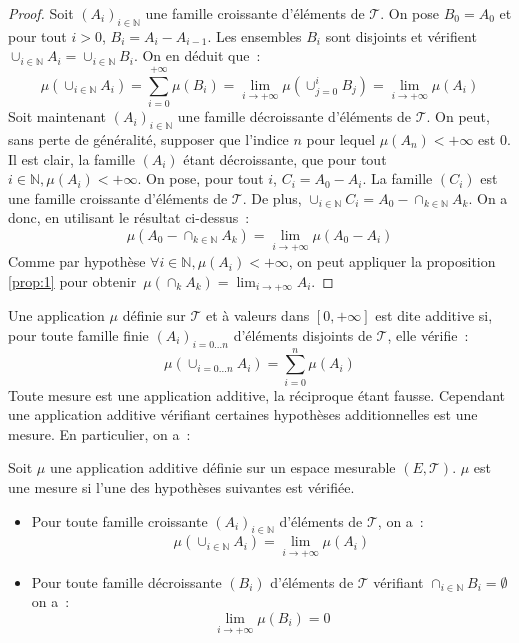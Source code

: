 \begin{proof}
Soit $(A_i)_{i \in \mathbb{N}}$ une famille croissante d'éléments de
$\mathcal{T}$. On pose $B_0 = A_0$ et pour tout $i> 0$, $B_i = A_i -
A_{i-1}$. Les ensembles $B_i$ sont disjoints et vérifient $\cup_{i \in
  \mathbb{N}} A_i
= \cup_{i \in \mathbb{N}} B_i$. On en déduit que~:
\[
\mu \left ( \cup_{i \in \mathbb{N}} A_i \right ) = \sum_{i=0}^{+\infty} \mu(B_i) = \lim_{i \to +\infty} \mu \left (
\cup_{j=0}^i B_j \right ) = \lim_{i \to +\infty} \mu(A_i)
\] 
Soit maintenant $(A_i)_{i \in \mathbb{N}}$ une famille décroissante
d'éléments de $\mathcal{T}$. On peut, sans perte de généralité,
supposer que l'indice $n$ pour lequel $\mu(A_n) < +\infty$ est 0. Il
est clair, la famille $(A_i)$ étant décroissante, que pour tout $i \in
\mathbb{N}, \mu(A_i) < +\infty$. On pose, pour tout $i$, $C_i = A_0 - A_i$.
La famille $(C_i)$ est une famille croissante d'éléments de  $\mathcal{T}$. De
plus, $\cup_{i \in \mathbb{N}} C_i = A_0 - \cap_{k \in \mathbb{N}} A_k$. On a
donc, en utilisant le résultat ci-dessus~:
\[
\mu \left ( A_0 - \cap_{k \in \mathbb{N}} A_k \right) = \lim_{i \to +\infty} \mu(A_0 - A_i)
\]
Comme par hypothèse $\forall i \in \mathbb{N}, \mu(A_i) < +\infty$, on peut appliquer la
proposition \ref{prop:1} pour obtenir~$\mu(\cap_k A_k) = \lim_{i \to +\infty} A_i$.
\end{proof}
Une application $\mu$ définie sur  $\mathcal{T}$ et à valeurs dans
$[0,+\infty]$ est dite additive si, pour toute famille finie $(A_i)_{i=0\dots n}$ d'éléments disjoints de
$\mathcal{T}$,  elle vérifie~:
\[
\mu(\cup_{i=0\dots n} A_i) = \sum_{i=0}^n \mu(A_i)
\]
Toute mesure est une application additive, la réciproque étant
fausse. Cependant une application additive vérifiant certaines
hypothèses additionnelles est une mesure. En
particulier, on a~:
\begin{prop}\label{prop:2}
Soit $\mu$ une application additive définie sur un espace mesurable
$(E, \mathcal{T})$. $\mu$ est une mesure si l'une des hypothèses
suivantes est vérifiée.
\begin{itemize}
\item Pour toute famille croissante $(A_i)_{i \in \mathbb{N}}$ d'éléments de
  $\mathcal{T}$, on a~:
\[
\mu(\cup_{i \in \mathbb{N}}  A_i) = \lim_{i \to +\infty} \mu(A_i)
\]
\item Pour toute famille décroissante $(B_i)$ d'éléments de
  $\mathcal{T}$ vérifiant $\cap_{i \in \mathbb{N}} B_i = \emptyset$ on a~:
\[
\lim_{i\to +\infty} \mu(B_i) = 0
\]
\end{itemize}
\end{prop}
